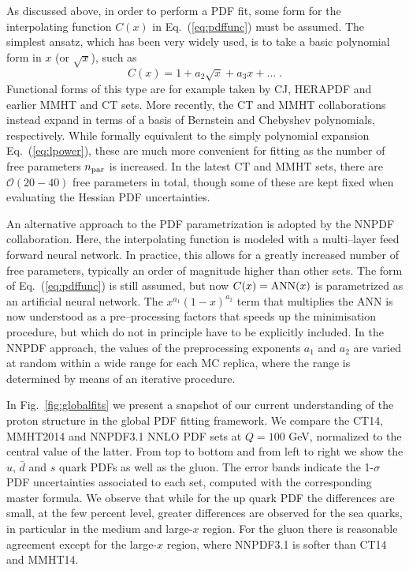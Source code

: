 As discussed above, in order to perform a  PDF fit, some form for the interpolating function $C(x)$ in Eq.~(\ref{eq:pdffunc})
must be assumed.
%
The simplest ansatz, which has been very widely used, is to take a basic polynomial form in $x$ (or $\sqrt{x}$), such as
\begin{equation}\label{eq:lpower}
C(x)=1+a_2\sqrt{x}+a_3 x+...\;.
\end{equation}
Functional forms of this type are for example taken by CJ, HERAPDF and earlier MMHT and CT sets. More recently, the CT and MMHT collaborations instead expand in terms of a basis of  Bernstein and Chebyshev polynomials, respectively.
%
While formally equivalent to the simply polynomial expansion
Eq.~(\ref{eq:lpower}), these are much more convenient for fitting as the number of free parameters $n_{\rm par}$ is increased.
%
In the latest CT and MMHT sets, there are $\mathcal{O}(20-40)$ free parameters in total, though some of these are kept fixed when evaluating the
Hessian PDF uncertainties.

An alternative approach to the PDF parametrization is adopted
by the NNPDF collaboration. Here, the interpolating function is modeled with a multi--layer feed forward neural network. In practice, this allows for a greatly increased number of free parameters, typically an order of magnitude higher than other sets.
%
The form of Eq.~(\ref{eq:pdffunc}) is still assumed, but
now $C(x)={\rm ANN}(x)$ is parametrized as an artificial
neural network.
%
The $x^{a_1}(1-x)^{a_2}$ term that multiplies the ANN is now understood
as a pre--processing factors that speeds up the minimisation procedure,
but which do not in principle have to be explicitly included.
%
In the NNPDF approach, the values of the preprocessing exponents
$a_1$ and $a_2$ are varied at random within a wide range for each MC
replica, where the range is determined by means of an iterative
procedure.

In Fig.~\ref{fig:globalfits}
we present a snapshot of our current understanding
of the proton structure in the global PDF fitting framework.
%
We compare the CT14, MMHT2014
  and NNPDF3.1 NNLO PDF sets at $Q=100$ GeV, normalized
  to the central value of the latter.
  From top to bottom and from left to right we show the
  $u$, $\bar{d}$ and $s$ quark PDFs as well as the gluon.
  The error bands indicate the 1-$\sigma$ PDF uncertainties
  associated to each set, computed with the corresponding
  master formula.
  We observe that while for the up quark PDF the differences
  are small, at the few percent level, greater differences
  are observed for the sea quarks, in particular
  in the medium and large-$x$ region.
  For the gluon there is reasonable agreement except
  for the large-$x$ region, where NNPDF3.1 is softer than
  CT14 and MMHT14.

